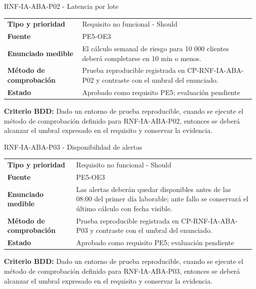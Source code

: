 \begin{reqbox}[colframe=Teal]{RNF-IA-ABA-P02 - Latencia por lote}
\begin{tabularx}{\textwidth}{>{\bfseries}p{3.2cm}Y}
Tipo y prioridad & Requisito no funcional - Should \\
Fuente & PE5-OE3 \\
Enunciado medible & El cálculo semanal de riesgo para 10 000 clientes deberá completarse en 10 min o menos. \\
Método de comprobación & Prueba reproducible registrada en CP-RNF-IA-ABA-P02 y contraste con el umbral del enunciado. \\
Estado & Aprobado como requisito PE5; evaluación pendiente \\
\end{tabularx}
\textbf{Criterio BDD:} Dado un entorno de prueba reproducible, cuando se ejecute el método de comprobación definido para RNF-IA-ABA-P02, entonces se deberá alcanzar el umbral expresado en el requisito y conservar la evidencia.
\end{reqbox}


\begin{reqbox}[colframe=Teal]{RNF-IA-ABA-P03 - Disponibilidad de alertas}
\begin{tabularx}{\textwidth}{>{\bfseries}p{3.2cm}Y}
Tipo y prioridad & Requisito no funcional - Should \\
Fuente & PE5-OE3 \\
Enunciado medible & Las alertas deberán quedar disponibles antes de las 08:00 del primer día laborable; ante fallo se conservará el último cálculo con fecha visible. \\
Método de comprobación & Prueba reproducible registrada en CP-RNF-IA-ABA-P03 y contraste con el umbral del enunciado. \\
Estado & Aprobado como requisito PE5; evaluación pendiente \\
\end{tabularx}
\textbf{Criterio BDD:} Dado un entorno de prueba reproducible, cuando se ejecute el método de comprobación definido para RNF-IA-ABA-P03, entonces se deberá alcanzar el umbral expresado en el requisito y conservar la evidencia.
\end{reqbox}


